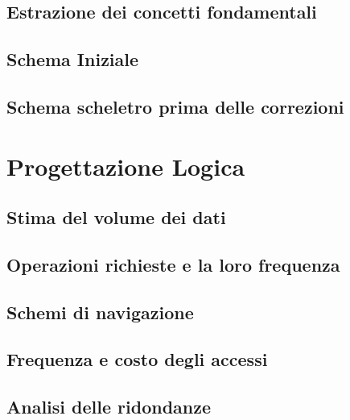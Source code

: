 \documentclass{article}
\begin{document}
\subsection{Estrazione dei concetti fondamentali}


\subsection{Schema Iniziale}


\subsection{Schema scheletro prima delle correzioni}




\section{Progettazione Logica}

\subsection{Stima del volume dei dati}


\subsection{Operazioni richieste e la loro frequenza}


\subsection{Schemi di navigazione}


\subsection{Frequenza e costo degli accessi}

\subsection{Analisi delle ridondanze}

\end{document}
